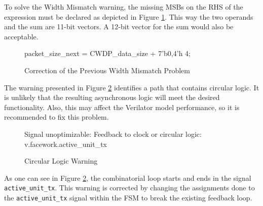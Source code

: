 \documentclass[defaultstyle,10pt,master,Helvetica]{thesis}
\begin{document}
To solve the Width Mismatch warning, the missing \acp{MSB} on the \ac{RHS} of the expression must be declared as depicted in Figure \ref{fig:casewidthsolve}. This way the two operands and the sum are 11-bit vectors. A 12-bit vector for the sum would also be acceptable.

\begin{figure}[H]
\begin{boxedverbatim}
packet_size_next = CWDP_data_size + {7'b0,4'h 4};
\end{boxedverbatim}
\caption{Correction of the Previous Width Mismatch Problem}
\label{fig:casewidthsolve}
\end{figure}

\clearpage

The warning presented in Figure \ref{fig:unoptflatwarn} identifies a path that contains circular logic. It is unlikely that the resulting asynchronous logic will meet the desired functionality. Also, this may affect the Verilator model performance, so it is recommended to fix this problem.

\begin{figure}[h]
\begin{boxedverbatim}
Signal unoptimizable: Feedback to clock or circular logic: v.facework.active_unit_tx
\end{boxedverbatim}
\caption{Circular Logic Warning}
\label{fig:unoptflatwarn}
\end{figure}

As one can see in Figure \ref{fig:unoptflatwarn}, the combinatorial loop starts and ends in the signal {\tt active\_unit\_tx}. This warning is corrected by changing the assignments done to the \texttt{active\_unit\_tx} signal within the \ac{FSM} to break the existing feedback loop.
\end{document}
